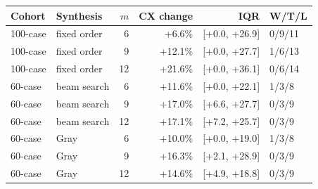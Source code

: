 \begin{tabular}{llrrrl}
\toprule
Cohort & Synthesis & $m$ & CX change & IQR & W/T/L\\
\midrule
100-case & fixed order & 6 & +6.6\% & [+0.0, +26.9] & 0/9/11\\
100-case & fixed order & 9 & +12.1\% & [+0.0, +27.7] & 1/6/13\\
100-case & fixed order & 12 & +21.6\% & [+0.0, +36.1] & 0/6/14\\
60-case & beam search & 6 & +11.6\% & [+0.0, +22.1] & 1/3/8\\
60-case & beam search & 9 & +17.0\% & [+6.6, +27.7] & 0/3/9\\
60-case & beam search & 12 & +17.1\% & [+7.2, +25.7] & 0/3/9\\
60-case & Gray & 6 & +10.0\% & [+0.0, +19.0] & 1/3/8\\
60-case & Gray & 9 & +16.3\% & [+2.1, +28.9] & 0/3/9\\
60-case & Gray & 12 & +14.6\% & [+4.9, +18.8] & 0/3/9\\
\bottomrule
\end{tabular}
